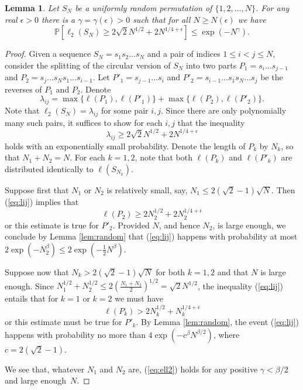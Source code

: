 \documentclass[reqno,12pt]{amsart}
\newtheorem{lemma}[theorem]{Lemma}
\newcommand{\of}[1]{\left( #1 \right)}
\newcommand{\refeq}[1]{(\ref{eq:#1})}
\newcommand{\PP}[1]{ {\mathbb P} \left[ #1 \right] }
\begin{document}
\begin{lemma}\label{lem:random2}
Let $S_N$ be a uniformly random permutation of $\{1,2,\ldots,N\}$. 
For any real $\epsilon>0$ there is a $\gamma=\gamma(\epsilon)>0$ such that
for all $N\ge N(\epsilon)$ we have
\begin{equation}\label{eq:ell2}
\PP{\ell_2(S_N)\ge2\sqrt2N^{1/2}+2N^{1/4+\epsilon}}\le\exp\of{-N^\gamma}.
\end{equation}
\end{lemma}

\begin{proof}
Given a sequence $S_N=s_1s_2\ldots s_N$ and a pair of indices $1\le i<j\le N$,
consider the splitting of the circular version of $S_N$ into two parts
$P_1=s_i\ldots s_{j-1}$ and $P_2=s_j\ldots s_Ns_1\ldots s_{i-1}$. Let $P'_1=s_{j-1}\ldots s_i$
and $P'_2=s_{i-1}\ldots s_1s_N\ldots s_j$ be the reverses of $P_1$ and $P_2$.
Denote 
$$
\lambda_{ij}=\max\{\ell(P_1),\ell(P'_1)\}+\max\{\ell(P_2),\ell(P'_2)\}.
$$
Note that $\ell_2(S_N)=\lambda_{ij}$ for some pair $i,j$.
Since there are only polynomially many such pairs,
it suffices to show for each $i,j$ that the inequality
\begin{equation}\label{eq:lij}
\lambda_{ij}\ge2\sqrt2N^{1/2}+2N^{1/4+\epsilon}
\end{equation}
holds with an exponentially small probability.
Denote the length of $P_k$ by $N_k$, so that $N_1+N_2=N$. For each $k=1,2$,
note that both $\ell(P_k)$ and $\ell(P'_k)$ are distributed identically to
$\ell(S_{N_k})$.

Suppose first that $N_1$ or $N_2$ is relatively small, say, $N_1\le2(\sqrt2-1)\sqrt N$.
Then \refeq{lij} implies that 
$$
\ell(P_2)\ge2N_2^{1/2}+2N_2^{1/4+\epsilon}
$$
or this estimate is true for $P'_2$. Provided $N$, and hence $N_2$, is large enough,
we conclude by Lemma \ref{lem:random} that \refeq{lij} happens with probability
at most $2\exp(-N_2^\beta)\le2\exp(-\frac12N^\beta)$.

Suppose now that $N_k>2(\sqrt2-1)\sqrt N$ for both $k=1,2$ and that $N$ is large enough.
Since
$
N_1^{1/2}+N_2^{1/2}\le2\of{\frac{N_1+N_2}{2}}^{1/2}=\sqrt2N^{1/2}
$,
the inequality \refeq{lij} entails that for $k=1$ or $k=2$ we must have
$$
\ell(P_k)>2N_k^{1/2}+N_k^{1/4+\epsilon}
$$
or this estimate must be true for $P'_k$. By Lemma \ref{lem:random}, the event \refeq{lij}
happens with probability no more than $4\exp\of{-c^\beta N^{\beta/2}}$, 
where $c=2(\sqrt2-1)$.

We see that, whatever $N_1$ and $N_2$ are, \refeq{ell2} holds for
any positive $\gamma<\beta/2$ and large enough~$N$.
\end{proof}
\end{document}
